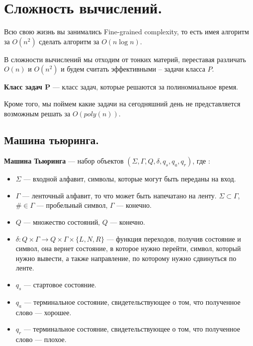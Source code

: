 \section{Сложность вычислений.}%
\label{sec:Сложность вычислений.}

Всю свою жизнь вы занимались Fine-grained complexity, 
то есть имея алгоритм за $O(n^2)$ сделать алгоритм за  $O(n\log n)$.

В сложности вычислений мы отходим от тонких материй, переставая различать $O(n)$ и  $O(n^2)$ 
и будем считать эффективными -- задачи класса  $P$.

\begin{Def}
    \textbf{Класс задач P} --- класс задач, которые решаются за полиномиальное время.
\end{Def}

Кроме того, мы поймем какие задачи на сегодняшний день не представляется возможным решать за $O(poly(n))$.

\subsection{Машина тьюринга.}%
\label{sub:Машина тьюринга.}
\begin{Def}
    \textbf{Машина Тьюринга} --- набор объектов $(\Sigma, \Gamma, Q, \delta, q_s, q_a, q_r)$, где :
    \begin{itemize}
        \item $\Sigma$ --- входной алфавит, символы, которые могут быть переданы на вход.
        \item $\Gamma$ --- ленточный алфавит, то что может быть напечатано на ленту. 
            $\Sigma \subset \Gamma$, $\# \in \Gamma$ --- пробельный символ, $\Gamma$ --- конечно.
        \item $Q$ --- множество состояний, $Q$ --- конечно.
        \item $\delta: Q \times \Gamma \rightarrow Q \times \Gamma \times \{L, N, R\}$ --- функция переходов, 
            получив состояние и символ, она вернет состояние, в которое нужно перейти, символ, который нужно вывести, 
            а также направление, по которому нужно сдвинуться по ленте.
        \item $q_s$ --- стартовое состояние.
        \item $q_a$ --- терминальное состояние, свидетельствующее о том, что полученное слово --- хорошее.
        \item $q_r$ --- терминальное состояние, свидетельствующее о том, что полученное слово --- плохое.
    \end{itemize}
\end{Def}

